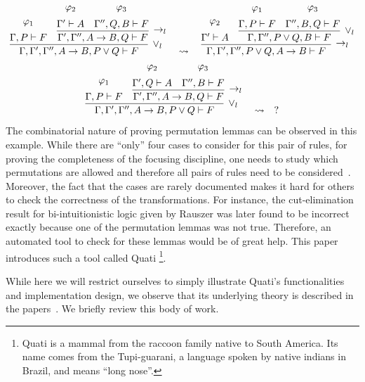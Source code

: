 \documentclass{llncs}
\begin{document}
{\scriptsize
\[
\infer[\vee_l]{\Gamma, \Gamma', \Gamma'', A \rightarrow B , P \vee Q \vdash F}{
  \deduce{\Gamma, P \vdash F}{\varphi_1\vspace{0.2cm}}
  &
  \infer[\rightarrow_l]{\Gamma', \Gamma'', A \rightarrow B , Q \vdash F}{
    \deduce{\Gamma' \vdash A}{\varphi_2\vspace{0.2cm}}
    &
    \deduce{\Gamma'', Q, B \vdash F}{\varphi_3\vspace{0.2cm}}
  }
}
\quad\rightsquigarrow\quad
\infer[\rightarrow_l]{\Gamma, \Gamma', \Gamma'', P \vee Q, A \rightarrow B
\vdash F}{
  \deduce{\Gamma' \vdash A}{\varphi_2\vspace{0.2cm}}
  &
  \infer[\vee_l]{\Gamma, \Gamma'', P \vee Q, B \vdash F}{
    \deduce{\Gamma, P \vdash F}{\varphi_1\vspace{0.2cm}}
    &
    \deduce{\Gamma'', B, Q \vdash F}{\varphi_3\vspace{0.2cm}}
  }
}
\]
}
{\scriptsize
\[
\infer[\vee_l]{\Gamma, \Gamma', \Gamma'', A \rightarrow B , P \vee Q \vdash F}{
  \deduce{\Gamma, P \vdash F}{\varphi_1\vspace{0.2cm}}
  &
  \infer[\rightarrow_l]{\Gamma', \Gamma'', A \rightarrow B , Q \vdash F}{
    \deduce{\Gamma', Q \vdash A}{\varphi_2\vspace{0.2cm}}
    &
    \deduce{\Gamma'', B \vdash F}{\varphi_3\vspace{0.2cm}}
  }
}
\quad\rightsquigarrow\quad
?
\]
}%
The combinatorial nature of proving permutation lemmas can be observed in
this example. While there are ``only'' four cases to consider for this pair of rules, for
proving the completeness of the focusing discipline, one needs to study which
permutations are allowed and therefore all pairs of rules need to be
considered~\cite{miller07cslb}.
Moreover, the fact that the cases are rarely documented makes it hard for others to check the
correctness of the transformations. For instance, the cut-elimination result for
bi-intuitionistic logic given by Rauszer \cite{rauszer74studia}
was later found to be incorrect \cite{crolard01tcs} exactly because one of the
permutation lemmas was not true. Therefore, an automated tool to check for these lemmas
would be of great help. This paper introduces such a tool called
Quati
\footnote{Quati is a mammal from the raccoon family native to
South America. Its name comes from the Tupi-guarani, a language
spoken by native indians in Brazil, and means ``long nose''.}.

While here we will restrict ourselves to simply illustrate Quati's
functionalities and implementation design, we observe that its underlying theory
is described in the papers~\cite{nigam.jlc,nigam13iclp,nigam14ebl}. We briefly
review this body of work.  
 
\end{document}
